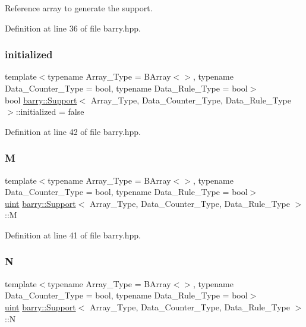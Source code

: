 Reference array to generate the support. 



Definition at line 36 of file barry.\+hpp.

\mbox{\label{classbarry_1_1_support_a4a9c004b1a42b5c3954319dec6211a0c}} 
\subsubsection{\texorpdfstring{initialized}{initialized}}
{\footnotesize\ttfamily template$<$typename Array\+\_\+\+Type = B\+Array$<$$>$, typename Data\+\_\+\+Counter\+\_\+\+Type = bool, typename Data\+\_\+\+Rule\+\_\+\+Type = bool$>$ \\
bool \hyperlink{classbarry_1_1_support}{barry\+::\+Support}$<$ Array\+\_\+\+Type, Data\+\_\+\+Counter\+\_\+\+Type, Data\+\_\+\+Rule\+\_\+\+Type $>$\+::initialized = false}



Definition at line 42 of file barry.\+hpp.

\mbox{\label{classbarry_1_1_support_abdf54592050a1c0db0fc7b079a7f9703}} 
\subsubsection{\texorpdfstring{M}{M}}
{\footnotesize\ttfamily template$<$typename Array\+\_\+\+Type = B\+Array$<$$>$, typename Data\+\_\+\+Counter\+\_\+\+Type = bool, typename Data\+\_\+\+Rule\+\_\+\+Type = bool$>$ \\
\hyperlink{namespacebarry_a11dfc53ddb4672278319aa04f1e09a6c}{uint} \hyperlink{classbarry_1_1_support}{barry\+::\+Support}$<$ Array\+\_\+\+Type, Data\+\_\+\+Counter\+\_\+\+Type, Data\+\_\+\+Rule\+\_\+\+Type $>$\+::M}



Definition at line 41 of file barry.\+hpp.

\mbox{\label{classbarry_1_1_support_a776221deb92d113e5dee1cb100174ed4}} 
\subsubsection{\texorpdfstring{N}{N}}
{\footnotesize\ttfamily template$<$typename Array\+\_\+\+Type = B\+Array$<$$>$, typename Data\+\_\+\+Counter\+\_\+\+Type = bool, typename Data\+\_\+\+Rule\+\_\+\+Type = bool$>$ \\
\hyperlink{namespacebarry_a11dfc53ddb4672278319aa04f1e09a6c}{uint} \hyperlink{classbarry_1_1_support}{barry\+::\+Support}$<$ Array\+\_\+\+Type, Data\+\_\+\+Counter\+\_\+\+Type, Data\+\_\+\+Rule\+\_\+\+Type $>$\+::N}



